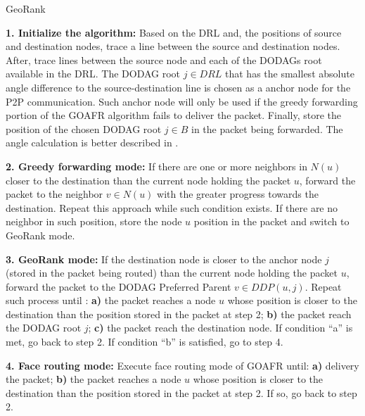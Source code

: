 \documentclass[final,authoryear,3p,twocolumn]{elsarticle}
\begin{document}
\small
\begin{algorithm}
\begin{algorithmic}
\caption{GeoRank}
\label{alg}
\small

\STATE \textbf{1. Initialize the algorithm:} Based on the DRL and, the positions of source and destination nodes, trace a line between the source and destination nodes. After, trace lines between the source node and each of the DODAGs root available in the DRL. The DODAG root $j \in DRL$ that has the smallest absolute angle difference to the source-destination line is chosen as a anchor node for the P2P communication. Such anchor node will only be used if the greedy forwarding portion of the GOAFR algorithm fails to deliver the packet. Finally, store the position of the chosen DODAG root $j \in B$ in the packet being forwarded. The angle calculation is better described in \citep{Denardin2011}.

\vspace{2.5mm}

\STATE \textbf{2. Greedy forwarding mode:} If there are one or more neighbors in $N(u)$ closer to the destination than the current node holding the packet $u$, forward the packet to the neighbor $v \in N(u)$ with the greater progress towards the destination. Repeat this approach while such condition exists. If there are no neighbor in such position, store the node $u$ position in the packet and switch to GeoRank mode.

\vspace{2.5mm}

\STATE \textbf{3. GeoRank mode:} If the destination node is closer to the anchor node $j$ (stored in the packet being routed) than the current node holding the packet $u$, forward the packet to the DODAG Preferred Parent $v \in DDP(u,j)$. Repeat such process until : \textbf{a)} the packet reaches a node $u$ whose position is closer to the destination than the position stored in the packet at step 2; \textbf{b)} the packet reach the DODAG root $j$; \textbf{c)} the packet reach the destination node. If condition ``a'' is met, go back to step 2. If condition ``b'' is satisfied, go to step 4.

\vspace{2.5mm}

\STATE \textbf{4. Face routing mode:} Execute face routing mode of GOAFR until: \textbf{a)} delivery the packet; \textbf{b)} the packet reaches a node $u$ whose position is closer to the destination than the position stored in the packet at step 2. If so, go back to step 2.

\small
\end{algorithmic}
\end{algorithm}
\normalsize
\end{document}
